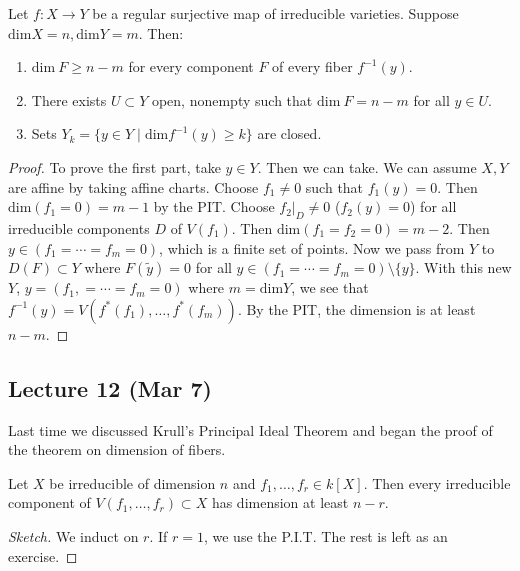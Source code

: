 \documentclass[twoside, 10pt]{article}
\begin{document}
    \begin{thm} Let $f:X \to Y$ be a regular surjective map of irreducible
        varieties.  Suppose $\mathrm{dim}X = n, \mathrm{dim}Y = m$. Then:
        \begin{enumerate} \item $\mathrm{dim}\ F \geq n-m$ for every component
            $F$ of every fiber $f^{-1}(y)$.  \item There exists $U \subset Y$
    open, nonempty such that $\mathrm{dim}\ F = n-m$ for all $y \in U$.  \item
    Sets $Y_k = \{y \in Y \mid \mathrm{dim} f^{-1}(y) \geq k\}$ are closed.
    \end{enumerate} \begin{proof} To prove the first part, take $y \in Y$. Then
    we can take. We can assume $X,Y$ are affine by taking affine charts. Choose
    $f_1 \neq 0$ such that $f_1(y) = 0$. Then $\mathrm{dim}(f_1=0) = m-1$ by
    the PIT. Choose $f_2 |_D \neq 0$ ($f_2(y) = 0$) for all irreducible
    components $D$ of $V(f_1)$. Then $\mathrm{dim}(f_1=f_2=0) = m-2$.  Then $y
    \in (f_1 = \cdots = f_m = 0)$, which is a finite set of points. Now we pass
    from $Y$ to $D(F) \subset Y$ where $F(\widetilde{y}) = 0$ for all $y \in
    (f_1 = \cdots = f_m = 0) \setminus \{y\}$. With this new $Y$, $y = (f_1, =
    \cdots = f_m = 0)$ where $m = \mathrm{dim}Y$, we see that $f^{-1}(y) =
    V(f^*(f_1), \ldots, f^*(f_m))$. By the PIT, the dimension is at least
    $n-m$.  \end{proof} \end{thm}

    \subsection{Lecture 12 (Mar 7)}
    
    Last time we discussed Krull's Principal Ideal Theorem and began the proof
    of the theorem on dimension of fibers.

    \begin{cor} Let $X$ be irreducible of dimension $n$ and $f_1, \ldots, f_r
        \in k[X]$. Then every irreducible component of $V(f_1, \ldots, f_r)
        \subset X$ has dimension at least $n - r$.  \begin{proof}[Sketch] We
            induct on $r$. If $r = 1$, we use the P.I.T. The rest is left as an
        exercise.  \end{proof} \end{cor}
    
\end{document}
